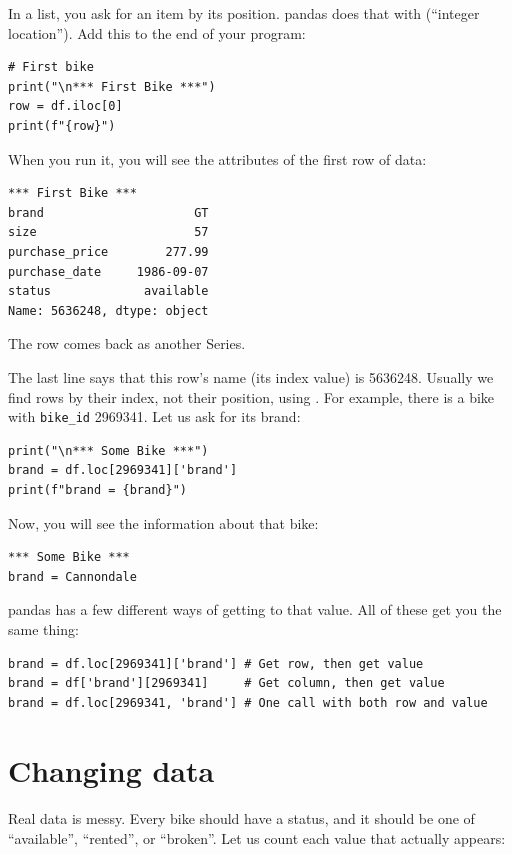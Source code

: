 In a list, you ask for an item by its position. pandas does that with
 (``integer location''). Add
this to the end of your program:

\begin{verbatim}
# First bike
print("\n*** First Bike ***")
row = df.iloc[0]
print(f"{row}")
\end{verbatim}

When you run it, you will see the attributes of the first row of data:

\begin{verbatim}
*** First Bike ***
brand                     GT
size                      57
purchase_price        277.99
purchase_date     1986-09-07
status             available
Name: 5636248, dtype: object
\end{verbatim}

The row comes back as another Series.

The last line says that this row's name (its index value) is 5636248.
Usually we find rows by their index, not their position, using
. For example, there is a bike with \texttt{bike\_id}
2969341. Let us ask for its brand:

\begin{verbatim}
print("\n*** Some Bike ***")
brand = df.loc[2969341]['brand']
print(f"brand = {brand}")
\end{verbatim}

Now, you will see the information about that bike:

\begin{verbatim}
*** Some Bike ***
brand = Cannondale
\end{verbatim}

pandas has a few different ways of getting to that value.  All of these get you the same thing:
\begin{verbatim}
brand = df.loc[2969341]['brand'] # Get row, then get value
brand = df['brand'][2969341]     # Get column, then get value
brand = df.loc[2969341, 'brand'] # One call with both row and value
\end{verbatim}

\section{Changing data}

Real data is messy. Every bike should have a status, and it should be one
of ``available'', ``rented'', or ``broken''. Let us count each value that
actually appears:

